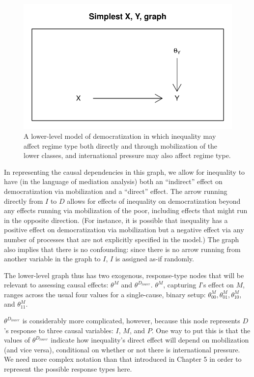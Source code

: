 \documentclass[12pt,]{book}
\begin{document}
\begin{figure}

{\centering \includegraphics[width=.7\textwidth]{ii_files/figure-latex/unnamed-chunk-37-1} 

}

\caption{\label{fig:lowdem} A lower-level model of democratization in which inequality may affect regime type both directly and through mobilization of the lower classes, and international pressure may also affect regime type.}\label{fig:unnamed-chunk-37}
\end{figure}

In representing the causal dependencies in this graph, we allow for inequality to have (in the language of mediation analysis) both an ``indirect'' effect on democratization via mobilization and a ``direct'' effect. The arrow running directly from \(I\) to \(D\) allows for effects of inequality on democratization beyond any effects running via mobilization of the poor, including effects that might run in the opposite direction. (For instance, it is possible that inequality has a positive effect on democratization via mobilization but a negative effect via any number of processes that are not explicitly specified in the model.) The graph also implies that there is no confounding: since there is no arrow running from another variable in the graph to \(I\), \(I\) is assigned as-if randomly.

The lower-level graph thus has two exogenous, response-type nodes that will be relevant to assessing causal effects: \(\theta^M\) and \(\theta^{D_{lower}}\). \(\theta^M\), capturing \(I\)'s effect on \(M\), ranges across the usual four values for a single-cause, binary setup: \(\theta_{00}^M, \theta_{01}^M, \theta_{10}^M\), and \(\theta_{11}^M\).

\(\theta^{D_{lower}}\) is considerably more complicated, however, because this node represents \(D\)'s response to three causal variables: \(I\), \(M\), and \(P\). One way to put this is that the values of \(\theta^{D_{lower}}\) indicate how inequality's direct effect will depend on mobilization (and vice versa), conditional on whether or not there is international pressure. We need more complex notation than that introduced in Chapter 5 in order to represent the possible response types here.
\end{document}
